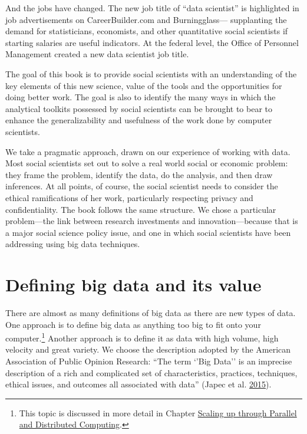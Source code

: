 \documentclass[]{krantz}
\begin{document}
And the jobs have changed. The new job title of ``data scientist'' is
highlighted in job advertisements on CareerBuilder.com and
Burningglass--- supplanting the demand for statisticians, economists,
and other quantitative social scientists if starting salaries are useful
indicators. At the federal level, the Office of Personnel Management
created a new data scientist job title.

The goal of this book is to provide social scientists with an
understanding of the key elements of this new science, value of the
tools and the opportunities for doing better work. The goal is also to
identify the many ways in which the analytical toolkits possessed by
social scientists can be brought to bear to enhance the generalizability
and usefulness of the work done by computer scientists.

We take a pragmatic approach, drawn on our experience of working with
data. Most social scientists set out to solve a real world social or
economic problem: they frame the problem, identify the data, do the
analysis, and then draw inferences. At all points, of course, the social
scientist needs to consider the ethical ramifications of her work,
particularly respecting privacy and confidentiality. The book follows
the same structure. We chose a particular problem---the link between
research investments and innovation---because that is a major social
science policy issue, and one in which social scientists have been
addressing using big data techniques.

\section{Defining big data and its value}\label{sec:1-2}

There are almost as many definitions of big data as there are new types
of data. One approach is to define big data as anything too big to fit
onto your computer.\footnote{This topic is discussed in more detail in
  Chapter \protect\hyperlink{chap:parallel}{Scaling up through Parallel
  and Distributed Computing}.} Another approach is to define it as data
with high volume, high velocity and great variety. We choose the
description adopted by the American Association of Public Opinion
Research: ``The term `'Big Data'' is an imprecise description of a rich
and complicated set of characteristics, practices, techniques, ethical
issues, and outcomes all associated with data'' (Japec et al.
\protect\hyperlink{ref-japec2015big}{2015}).
\end{document}
